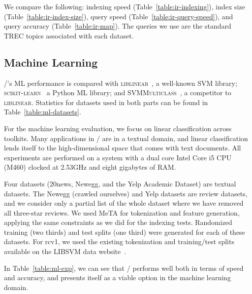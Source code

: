 We compare the following: indexing speed (Table~\ref{table:ir-indexing}), index
size (Table~\ref{table:ir-index-size}), query speed
(Table~\ref{table:ir-query-speed}), and query accuracy
(Table~\ref{table:ir-map}). The queries we use are the standard TREC topics
associated with each dataset.







\subsection{Machine Learning}

\meta/'s ML performance is compared with \textsc{liblinear}~\cite{liblinear}, a
well-known SVM library; \textsc{scikit-learn}~\cite{scikit} a Python ML library;
and \textsc{SVMMulticlass}~\cite{svmmulticlass}, a competitor to
\textsc{liblinear}. Statistics for datasets used in both parts can be found in
Table~\ref{table:ml-datasets}.

For the machine learning evaluation, we focus on linear classification across
toolkits. Many applications in \meta/ are in a textual domain, and linear
classification lends itself to the high-dimensional space that comes with text
documents. All experiments are performed on a system with a dual core Intel Core
i5 CPU (M460) clocked at 2.53GHz and eight gigabytes of RAM.

Four datasets (20news\footnotemark[6], Newegg, and the Yelp Academic
Dataset\footnotemark[10]) are textual datasets. The Newegg (crawled ourselves)
and Yelp datasets are review datasets, and we consider only a partial list of
the whole dataset where we have removed all three-star reviews. We used MeTA for
tokenization and feature generation, applying the same constraints as we did for
the indexing tests. Randomized training (two thirds) and test splits (one third)
were generated for each of these datasets. For rcv1, we used the existing
tokenization and training/test splits available on the LIBSVM data
website~\footnotemark[11].


In Table~\ref{table:ml-exp}, we can see that \meta/ performs well both in
terms of speed and accuracy, and presents itself as a viable option in the
machine learning domain.



